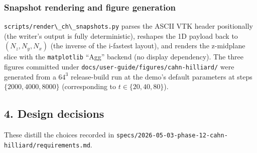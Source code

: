 \subsubsection{Snapshot rendering and figure
generation}\label{phase12-figures}

\passthrough{\lstinline!scripts/render\_ch\_snapshots.py!} parses the
ASCII VTK header positionally (the writer's output is fully
deterministic), reshapes the 1D payload back to \((N_z, N_y, N_x)\)
(the inverse of the i-fastest layout), and renders the z-midplane
slice with the \passthrough{\lstinline!matplotlib!} ``Agg'' backend
(no display dependency). The three figures committed under
\passthrough{\lstinline!docs/user-guide/figures/cahn-hilliard/!}
were generated from a \(64^3\) release-build run at the demo's
default parameters at steps \(\{2000, 4000, 8000\}\) (corresponding
to \(t \in \{20, 40, 80\}\)).

\subsection{4. Design decisions}\label{phase12-decisions}

These distill the choices recorded in
\passthrough{\lstinline!specs/2026-05-03-phase-12-cahn-hilliard/requirements.md!}.

